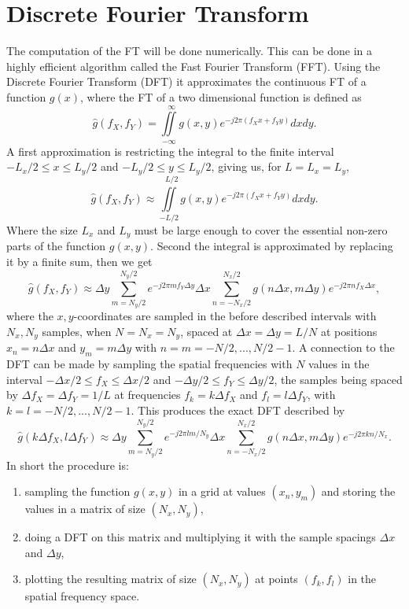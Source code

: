 \section{Discrete Fourier Transform}
\label{sec:DFT}
The computation of the FT will be done numerically. This can be done in a highly efficient algorithm called the Fast Fourier Transform (FFT). Using the Discrete Fourier Transform (DFT) it approximates the continuous FT of a function $g(x)$, where the FT of a two dimensional function is defined as
\begin{equation}
\hat{g}(f_X,f_Y)=\iint\limits_{-\infty}^{~~~\infty} g(x,y)e^{-j2\pi(f_Xx + f_Yy)}dxdy.
\end{equation}
A first approximation is restricting the integral to the finite interval $-L_x/2 \leq x \leq L_y/2$ and $-L_y/2 \leq y \leq L_y/2$, giving us, for $L=L_x=L_y$,
\begin{equation}
\hat{g}(f_X,f_Y)\approx\iint\limits_{-L/2}^{~~~L/2} g(x,y)e^{-j2\pi(f_Xx + f_Yy)}dxdy.
\end{equation}
Where the size $L_x$ and $L_y$ must be large enough to cover the essential non-zero parts of the function $g(x,y)$. Second the integral is approximated by replacing it by a finite sum, then we get
\begin{equation}
\hat{g}(f_X,f_Y)\approx  \Delta y \sum\limits_{m=N_y/2}^{N_y/2} e^{-j2\pi mf_Y\Delta y}\Delta x\sum\limits_{n=-N_x/2}^{N_x/2}g(n\Delta x,m\Delta y)e^{-j2\pi nf_X\Delta x },
\end{equation}
where the $x,y$-coordinates are sampled in the before described intervals with $N_x,N_y$ samples, when $N=N_x=N_y$, spaced at $\Delta x=\Delta y = L/N$ at positions $x_n=n\Delta x$ and $y_m=m\Delta y$ with $n=m=-N/2,...,N/2-1$. A connection to the DFT can be made by sampling the spatial frequencies with $N$ values in the interval $-\Delta x/2 \leq f_X \leq \Delta x/2$ and $-\Delta y/2 \leq f_Y \leq \Delta y/2$, the samples being spaced by $\Delta f_X=\Delta f_Y=1/L$ at frequencies $f_k=k\Delta f_X$ and $f_l=l\Delta f_Y$, with $k=l=-N/2,...,N/2-1$. This produces the exact DFT described by
\begin{equation}
\hat{g}(k\Delta f_X,l\Delta f_Y)\approx  \Delta y \sum\limits_{m=N_y/2}^{N_y/2} e^{-j2\pi lm/N_y}\Delta x\sum\limits_{n=-N_x/2}^{N_x/2}g(n\Delta x,m\Delta y)e^{-j2\pi kn/N_x}.
\end{equation}
In short the procedure is:
\begin{enumerate}
	\item sampling the function $g(x,y)$ in a grid at values $(x_n,y_m)$ and storing the values in a matrix of size $(N_x,N_y)$,
	\item doing a DFT on this matrix and multiplying it with the sample spacings $\Delta x$ and $\Delta y$,
	\item plotting the resulting matrix of size $(N_x,N_y)$ at points $(f_k,f_l)$ in the spatial frequency space.
\end{enumerate}

